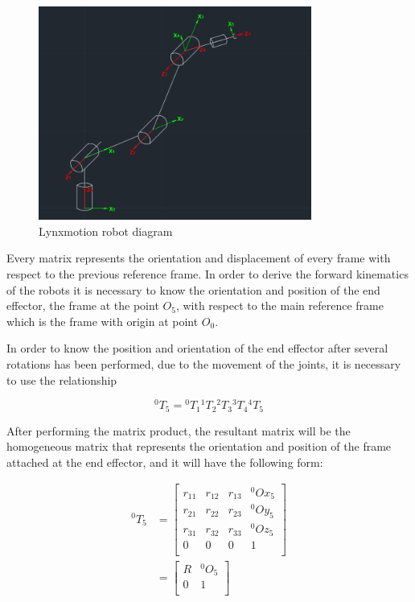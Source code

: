 \documentclass{article}
\newcommand{\T}[2]{{}^{#1}T_{#2}}
\begin{document}
\begin{figure}
\begin{center}
\includegraphics[width=0.8\textwidth]{images/diagram}
\caption{Lynxmotion robot diagram}
\label{fig:forward.diagram}
\end{center}
\end{figure}

Every matrix represents the orientation and displacement of every frame with respect to the previous reference frame. In order to derive the forward kinematics of the robots it is necessary to know the orientation and position of the end effector, the frame at the point $O_5$, with respect to the main reference frame which is the frame with origin at point $O_0$.

In order to know the position and orientation of the end effector after several rotations has been performed, due to the movement of the joints, it is necessary to use the relationship

\begin{equation}
\T{0}{5} = \T{0}{1} \T{1}{2}\T{2}{3}\T{3}{4}\T{4}{5}
\end{equation}

After performing the matrix product, the resultant matrix will be the homogeneous matrix that represents the orientation and position of the frame attached at the end effector, and it will have the following form:

\begin{subequations}
\begin{align}
\T{0}{5} & = \left[
\begin{array}{cccc}
	r_{11} & r_{12} & r_{13} & {}^0Ox_5 \\
	r_{21} & r_{22} & r_{23} & {}^0Oy_5 \\
	r_{31} & r_{32} & r_{33} & {}^0Oz_5 \\
	0 & 0 & 0 & 1 \\
\end{array}
\right] \\
& = \left[
\begin{array}{cc}
	R & {}^0O_5 \\
	 0 & 1 \\
\end{array}
\right] 
\end{align}
\end{subequations}
\end{document}
